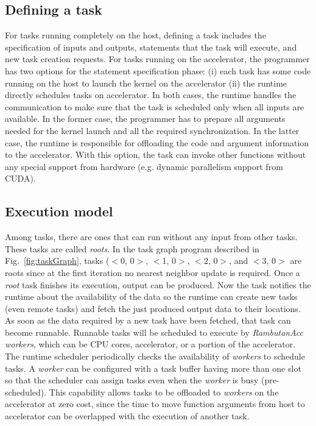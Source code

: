 \subsection{Defining a task}
For tasks running completely on the host, defining a task includes the specification of inputs and outputs, statements that the task will execute, and new task creation requests.
For tasks running on the accelerator, the programmer has two options for the statement specification phase: (i) each task has some code running on the host to launch the kernel on the accelerator (ii) the runtime directly schedules tasks on accelerator.
In both cases, the runtime handles the communication to make sure that the task is scheduled only when all inputs are available.
In the former case, the programmer has to prepare all arguments needed for the kernel launch and all the required synchronization.
In the latter case, the runtime is responsible for offloading the code and argument information to the accelerator.
With this option, the task can invoke other functions without any special support from hardware (e.g. dynamic parallelism support from CUDA).


\subsection{Execution model}
Among tasks, there are ones that can run without any input from other tasks.
These tasks are called {\em roots}.
In the task graph program described in Fig.~\ref{fig:taskGraph}, tasks ($<$0, 0$>$, $<$1, 0$>$, $<$2, 0$>$, and $<$3, 0$>$ are roots since at the first iteration no nearest neighbor update is required.
Once a {\em root} task finishes its execution, output can be produced.
Now the task notifies the runtime about the availability of the data so the runtime can create new tasks (even remote tasks) and fetch the just produced output data to their locations.
As soon as the data required by a new task have been fetched, that task can become runnable.
Runnable tasks will be scheduled to execute by {\em RambutanAcc} {\em workers}, which can be CPU cores, accelerator, or a portion of the accelerator.
The runtime scheduler periodically checks the availability of {\em workers} to schedule tasks. 
A {\em worker} can be configured with a task buffer having more than one slot so that the scheduler can assign tasks even when the {\em worker} is busy (pre-scheduled). 
This capability allows tasks to be offloaded to {\em workers} on the accelerator at zero cost, since the time to move function arguments from host to accelerator can be overlapped with the execution of another task.

